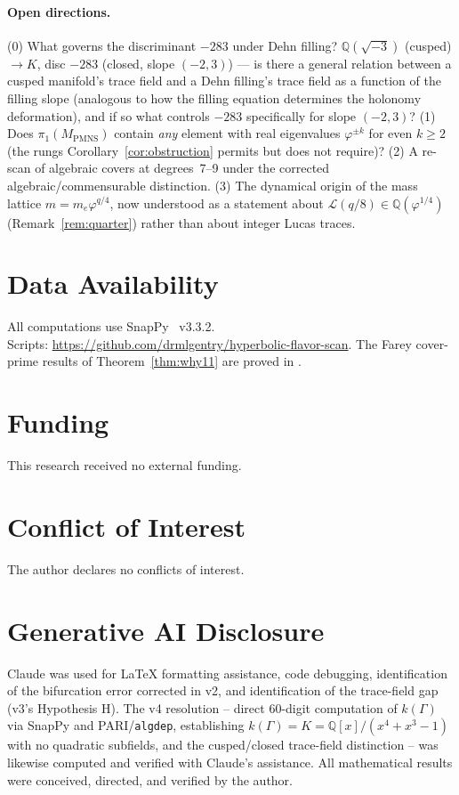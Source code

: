 \documentclass[12pt]{article}
\theoremstyle{definition}
\newcommand{\Q}{\mathbb{Q}}
\newcommand{\ph}{\varphi}
\newcommand{\Lcal}{\mathcal{L}}
\begin{document}
\paragraph{Open directions.} (0) What governs the discriminant $-283$
under Dehn filling? $\Q(\sqrt{-3})$ (cusped) $\to K$, disc $-283$
(closed, slope $(-2,3)$) --- is there a general relation between a
cusped manifold's trace field and a Dehn filling's trace field as a
function of the filling slope (analogous to how the filling equation
determines the holonomy deformation), and if so what controls $-283$
specifically for slope $(-2,3)$? (1) Does
$\pi_1(M_{\mathrm{PMNS}})$ contain
\emph{any} element with real eigenvalues $\ph^{\pm k}$ for
even $k\geq2$ (the rungs Corollary~\ref{cor:obstruction} permits but
does not require)? (2) A re-scan of algebraic covers at
degrees~7--9 under the corrected algebraic/commensurable distinction.
(3) The dynamical origin of the mass lattice $m=m_e\ph^{q/4}$, now
understood as a statement about $\Lcal(q/8)\in\Q(\ph^{1/4})$
(Remark~\ref{rem:quarter}) rather than about integer Lucas traces.

\section*{Data Availability}
All computations use SnapPy~\cite{snappy} v3.3.2.\\
Scripts: \url{https://github.com/drmlgentry/hyperbolic-flavor-scan}. The Farey
cover-prime results of Theorem~\ref{thm:why11} are proved in
\cite{gentry-z5bridge}.

\section*{Funding}
This research received no external funding.

\section*{Conflict of Interest}
The author declares no conflicts of interest.

\section*{Generative AI Disclosure}
Claude was used for \LaTeX{} formatting assistance, code debugging,
identification of the bifurcation error corrected in v2, and
identification of the trace-field gap (v3's Hypothesis H). The v4
resolution -- direct $60$-digit computation of $k(\Gamma)$ via SnapPy
and PARI/\texttt{algdep}, establishing $k(\Gamma)=K=\Q[x]/(x^4+x^3-1)$
with no quadratic subfields, and the cusped/closed trace-field
distinction -- was likewise computed and verified with Claude's
assistance. All mathematical results were conceived, directed, and
verified by the author.
\end{document}
